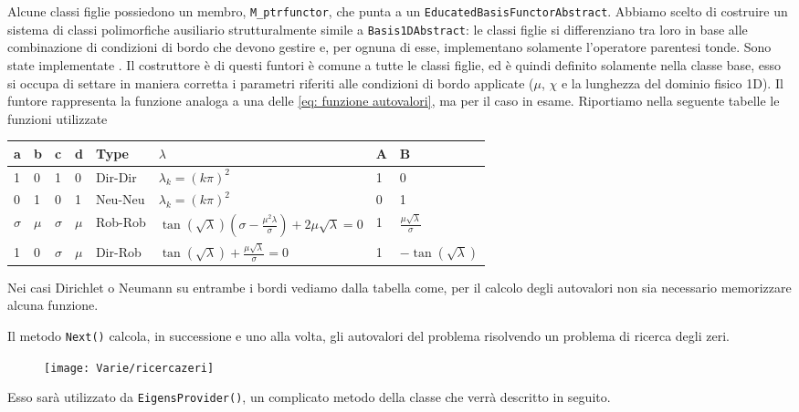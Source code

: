 Alcune classi figlie possiedono un membro, \texttt{M\_ptrfunctor}, che punta a un \texttt{EducatedBasisFunctorAbstract}. 
Abbiamo scelto di costruire un sistema di classi polimorfiche ausiliario strutturalmente simile a \texttt{Basis1DAbstract}:
le classi figlie si differenziano tra loro in base alle combinazione di condizioni di bordo che devono gestire e,
per ognuna di esse, implementano solamente l'operatore parentesi tonde. Sono state implementate .
Il costruttore \`e di questi funtori \`e comune a tutte le classi figlie, ed \`e quindi 
definito solamente nella classe base, esso si occupa di settare in maniera corretta i parametri riferiti alle condizioni di bordo applicate ($\mu
$, $\chi$ e la lunghezza del dominio fisico 1D). 
Il funtore rappresenta la funzione analoga a una delle \eqref{eq: funzione autovalori}, ma per il caso in esame.
Riportiamo nella seguente tabelle le funzioni utilizzate

\vspace{0.2cm}
\noindent
\begin{tabular}{l l l l l l l l }
\toprule
a	&b	&c		&d	&Type		&$\lambda$ 					 				&A&B\\
\midrule
1	&0	&1		&0	&Dir-Dir	&$\lambda_k=(k\pi)^2$						&1&0\\
0	&1	&0		&1	&Neu-Neu	&$\lambda_k=(k\pi)^2$						&0&1\\
$\sigma$&$\mu$	&$\sigma$	&$\mu$	&Rob-Rob		&$\tan{(\sqrt{\lambda})}
(\sigma-\frac{\mu^2\lambda}{\sigma})+2\mu\sqrt{\lambda}=0$								&1&$\frac{\mu\sqrt{\lambda}}{\sigma}$\\
1	&0	&$\sigma$	&$\mu$	&Dir-Rob	&$\tan{(\sqrt{\lambda})}+\frac{\mu\sqrt{\lambda}}{\sigma}=0$	&1&$-\tan{(\sqrt{\lambda})}$  \\
\bottomrule
\end{tabular}
\vspace{0.2cm} 
Nei casi Dirichlet o Neumann su entrambe i bordi vediamo dalla tabella come, per il calcolo degli autovalori non sia necessario memorizzare alcuna funzione.

Il metodo \texttt{Next()} calcola, in successione e uno alla volta, gli autovalori del problema risolvendo un problema di 
ricerca degli zeri.
\begin{figure}[!h]
        \centering%
        \texttt{[image: Varie/ricercazeri]}
\end{figure}
Esso sar\`a utilizzato da \texttt{EigensProvider()}, un complicato metodo della classe  che verr\`a descritto in seguito.

